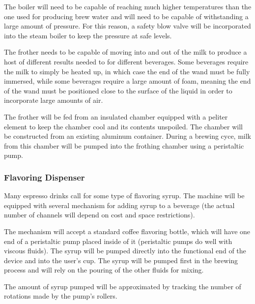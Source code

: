 \documentclass[conference]{IEEEtran}
\begin{document}
The boiler will need to be capable of reaching much higher temperatures than the
one used for producing brew water and will need to be capable of withstanding a
large amount of pressure. For this reason, a safety blow valve will be incorporated
into the steam boiler to keep the pressure at safe levels.


The frother needs to be capable of moving into and out of the milk to produce a host
of different results needed to for different beverages. Some beverages require the milk
to simply be heated up, in which case the end of the wand must be fully immersed, while
some beverages require a large amount of foam, meaning the end of the wand must be positioned
close to the surface of the liquid in order to incorporate large amounts of air.

The frother will be fed from an insulated chamber equipped with a peliter element
to keep the chamber cool and its contents unspoiled. The chamber will be constructed from
an existing aluminum container. During a brewing cyce, milk from this chamber will be
pumped into the frothing chamber using a peristaltic pump.


\subsubsection{Flavoring Dispenser}
Many espresso drinks call for some type of flavoring syrup. The machine will be equipped
with several mechanism for adding syrup to a beverage (the actual number of channels will
depend on cost and space restrictions).

The mechanism will accept a standard coffee flavoring bottle, which will have one end
of a peristaltic pump placed inside of it (peristaltic pumps do well with viscous
fluids). The syrup will be pumped directly into the functional end of the device and
into the user's cup. The syrup will be pumped first in the brewing process and will rely
on the pouring of the other fluids for mixing.

The amount of syrup pumped will be approximated by tracking the number of rotations
made by the pump's rollers.

\end{document}
